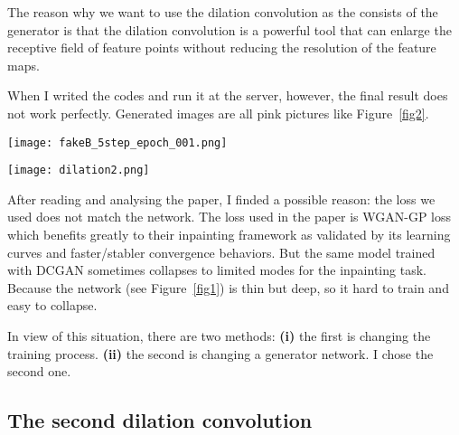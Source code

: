 \documentclass[a4paper]{article}
\begin{document}
The reason why we want to use the dilation convolution as the consists of the generator is that the dilation convolution is a powerful tool that can enlarge the receptive field of feature points without reducing the resolution of the feature maps. 

When I writed the codes and run it at the server, however, the final result does not work perfectly. Generated images are all pink pictures like Figure~\ref{fig2}.

\begin{figure*}
\begin{center}
\texttt{[image: fakeB\_5step\_epoch\_001.png]}
\end{center}
\caption{The generated fakeB image at the epoch 001.}
\label{fig2}
\end{figure*}

\begin{figure*}
\begin{center}
\texttt{[image: dilation2.png]}
\end{center}
\caption{D-LinkNet architecture. Each blue rectangular block represents a multi-channel features map. Part A is the encoder of D-LinkNet. D-LinkNet uses ResNet34 as encoder. Part C is the decoder of D-LinkNet, it is set the same as LinkNet decoder. Original LinkNet only has Part A and Part C. D-LinkNet has an additional Part B which can enlarge the receptive field and as well as preserve the detailed spatial information. Each convolution layer is followed by a ReLU activation except the last convolution layer which use sigmoid activation.}
\label{fig3}
\end{figure*}

After reading and analysing the paper, I finded a possible reason: the loss we used does not match the network. The loss used in the paper is WGAN-GP loss which benefits greatly to their inpainting framework as validated by its learning curves and faster/stabler convergence behaviors. But the same model trained with DCGAN sometimes collapses to limited modes for the inpainting task. Because the network (see Figure~\ref{fig1}) is thin but deep, so it hard to train and easy to collapse. 

In view of this situation, there are two methods: {\bf (i)} the first is changing the training process. {\bf (ii)} the second is changing a generator network. I chose the second one.

\subsection{The second dilation convolution}
\end{document}
